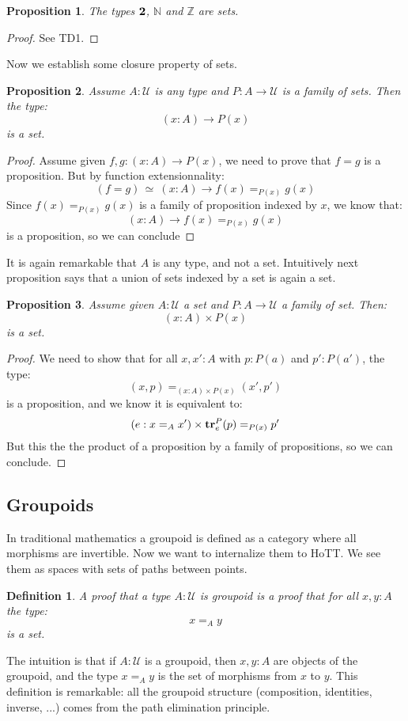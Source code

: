 \documentclass{article}
\newcommand{\sse}[1]{\medbreak \subsection{#1}}
\newcommand{\U}{{\mathcal U}}
\renewcommand{\r}{\rightarrow}
\newcommand{\tr}{\mathrm{\bf tr}}
\newcommand{\two}{{\bf 2}}
\newtheorem{definition}{Definition}
\newtheorem{proposition}{Proposition}
\begin{document}
\begin{proposition}
The types $\two$, $\mathbb{N}$ and $\mathbb{Z}$ are sets.
\end{proposition}
\begin{proof}
See TD1.
\end{proof}

Now we establish some closure property of sets.

\begin{proposition}
Assume $A:\U$ is any type and $P:A\r \U$ is a family of sets. Then the type:
\[(x:A)\r P(x)\]
is a set.
\end{proposition}
\begin{proof}
Assume given $f,g:(x:A)\r P(x)$, we need to prove that $f=g$ is a proposition. But by function extensionnality:
\[(f=g)\, \simeq \ (x:A)\r f(x)=_{P(x)}g(x)\]
Since $f(x)=_{P(x)}g(x)$ is a family of proposition indexed by $x$, we know that:
\[(x:A)\r f(x)=_{P(x)}g(x)\]
is a proposition, so we can conclude
\end{proof}

It is again remarkable that $A$ is any type, and not a set. Intuitively next proposition says that a union of sets indexed by a set is again a set.

\begin{proposition}
Assume given $A:\U$ a set and $P:A\r \U$ a family of set. Then:
\[(x:A)\times P(x)\]
is a set.
\end{proposition}
\begin{proof}
We need to show that for all $x,x':A$ with $p:P(a)$ and $p':P(a')$, the type:
\[(x,p)=_{(x:A)\times P(x)}(x',p')\]
is a proposition, and we know it is equivalent to:
\[(e:x=_Ax')\times \tr^P_e(p) =_{P(x)} p'\]
But this the the product of a proposition by a family of propositions, so we can conclude.
\end{proof}


\sse{Groupoids}

In traditional mathematics a groupoid is defined as a category where all morphisms are invertible. Now we want to internalize them to HoTT. We see them as spaces with sets of paths between points.

\begin{definition}
A proof that a type $A:\U$ is groupoid is a proof that for all $x,y:A$ the type:
\[x=_Ay\]
is a set.
\end{definition}

The intuition is that if $A:\U$ is a groupoid, then $x,y:A$ are objects of the groupoid, and the type $x=_Ay$ is the set of morphisms from $x$ to $y$.
This definition is remarkable: all the groupoid structure (composition, identities, inverse, ...) comes from the path elimination principle.
\end{document}
